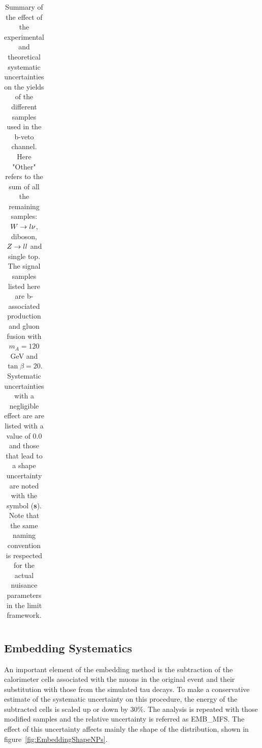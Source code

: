 \begin{table}
\begin{tabular}{lccccc}
    \hline
    \hline
  \end{tabular}
  \caption{Summary of the effect of the experimental and theoretical systematic uncertainties on the yields of the different
	samples used  in the b-veto channel. Here "Other" refers to the sum of all the remaining samples: 
	$W\rightarrow l\nu$, diboson, $Z\rightarrow ll$ and single top. The signal samples listed here are b-associated production 
	and gluon fusion with $m_{A}=120$ GeV and $\tan\beta=20$. 
	 Systematic uncertainties with a negligible effect are are listed with a value of 0.0
	 and those that lead to a  shape uncertainty are noted with the symbol (\textbf{s}). 
	Note that the same naming convention is respected for the actual nuisance parameters in the limit framework.}
 \label{tab:ExpSys:bveto}
\end{table}



\subsection{\Ztautau Embedding Systematics}
An important element of the embedding method is the subtraction of the 
calorimeter cells associated with the muons in the original \Zmumu event and their substitution with those from the simulated tau
decays. To make a conservative estimate of the systematic uncertainty on this procedure, 
the energy of the subtracted cells is scaled up or down by 30\%. The analysis is repeated with those modified 
samples and the relative uncertainty is referred as EMB\_MFS. The effect of this uncertainty affects mainly the shape of the \mmc 
distribution, shown in figure~\ref{fig:EmbeddingShapeNPs}.


